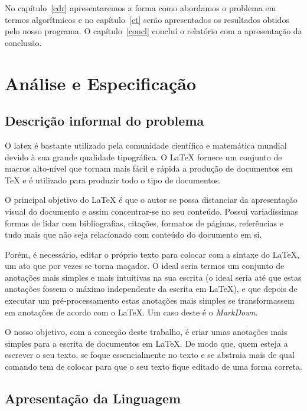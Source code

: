\documentclass{article}
\begin{document}
No capítulo~\ref{cdr} apresentaremos a forma como abordamos o problema em termos algorítmicos e no capítulo~\ref{ct} serão apresentados os resultados obtidos pelo nosso programa. O capítulo~\ref{concl} concluí o relatório com a apresentação da conclusão.



\section{Análise e Especificação} \label{ae}
\subsection{Descrição informal do problema}

O latex é bastante utilizado pela comunidade científica e matemática mundial devido à sua grande qualidade tipográfica. O LaTeX fornece um conjunto de macros alto-nível que tornam mais fácil e rápida a produção de documentos em TeX e é utilizado para produzir todo o tipo de documentos. \par

O principal objetivo do LaTeX é que o autor se possa distanciar da apresentação visual do documento e assim concentrar-se no seu conteúdo. Possui variadíssimas formas de lidar com bibliografias, citações, formatos de páginas, referências e tudo mais que não seja relacionado com conteúdo do documento em si. \par

Porém, é necessário, editar o próprio texto para colocar com a sintaxe do LaTeX, um ato que por vezes se torna maçador. O ideal seria termos um conjunto de anotações mais simples e mais intuitivas na sua escrita (o ideal seria até que estas anotações fossem o máximo independente da escrita em LaTeX), e que depois de executar um pré-processamento estas anotações mais simples se transformassem em anotações de acordo com o LaTeX. Um caso deste é o \textit{MarkDown}. \par

O nosso objetivo, com a conceção deste trabalho, é criar umas anotações mais simples para a escrita de documentos em LaTeX. De modo que, quem esteja a escrever o seu texto, se foque essencialmente no texto e se abstraia mais de qual comando tem de colocar para que o seu texto fique editado de uma forma correta.

\subsection{Apresentação da Linguagem}
\end{document}
